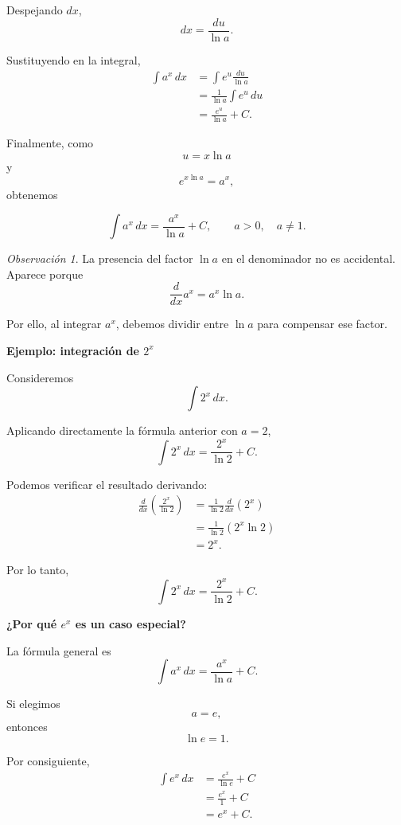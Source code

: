 \documentclass[12pt]{article}
\theoremstyle{definition}
\theoremstyle{remark}
\newtheorem*{observacion}{Observación}
\begin{document}
Despejando \(dx\),
\[
dx=\frac{du}{\ln a}.
\]

Sustituyendo en la integral,
\[
\begin{aligned}
\int a^x\,dx
&=
\int e^u\frac{du}{\ln a}
\\[0.3cm]
&=
\frac{1}{\ln a}\int e^u\,du
\\[0.3cm]
&=
\frac{e^u}{\ln a}+C.
\end{aligned}
\]

Finalmente, como
\[
u=x\ln a
\]
y
\[
e^{x\ln a}=a^x,
\]
obtenemos

\[
\boxed{
\int a^x\,dx
=
\frac{a^x}{\ln a}+C
},
\qquad
a>0,\quad a\neq 1.
\]

\begin{observacion}
La presencia del factor \(\ln a\) en el denominador no es accidental.
Aparece porque
\[
\frac{d}{dx}a^x=a^x\ln a.
\]

Por ello, al integrar \(a^x\), debemos dividir entre \(\ln a\) para
compensar ese factor.
\end{observacion}

\textbf{Ejemplo: integración de \(2^x\)}

Consideremos
\[
\int 2^x\,dx.
\]

Aplicando directamente la fórmula anterior con \(a=2\),
\[
\boxed{
\int 2^x\,dx
=
\frac{2^x}{\ln 2}+C
}.
\]

Podemos verificar el resultado derivando:
\[
\begin{aligned}
\frac{d}{dx}
\left(
\frac{2^x}{\ln 2}
\right)
&=
\frac{1}{\ln 2}
\frac{d}{dx}\left(2^x\right)
\\[0.3cm]
&=
\frac{1}{\ln 2}
\left(2^x\ln 2\right)
\\[0.3cm]
&=
2^x.
\end{aligned}
\]

Por lo tanto,
\[
\boxed{
\int 2^x\,dx
=
\frac{2^x}{\ln 2}+C
}.
\]

\textbf{¿Por qué \(e^x\) es un caso especial?}

La fórmula general es
\[
\int a^x\,dx
=
\frac{a^x}{\ln a}+C.
\]

Si elegimos
\[
a=e,
\]
entonces
\[
\ln e=1.
\]

Por consiguiente,
\[
\begin{aligned}
\int e^x\,dx
&=
\frac{e^x}{\ln e}+C
\\[0.3cm]
&=
\frac{e^x}{1}+C
\\[0.3cm]
&=
e^x+C.
\end{aligned}
\]
\end{document}
